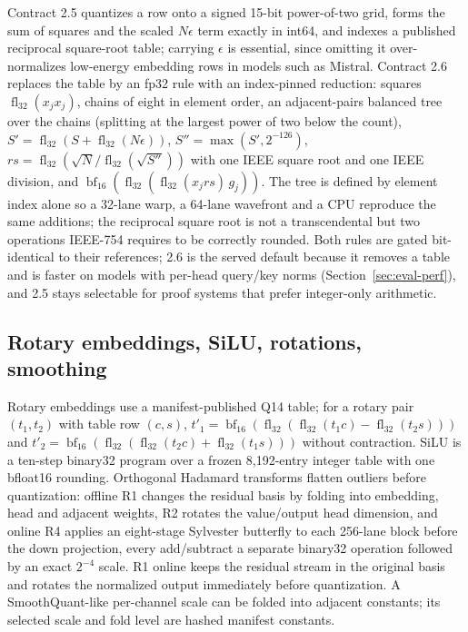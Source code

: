 \documentclass{article}
\newcommand{\fl}{\operatorname{fl}_{32}}
\newcommand{\bfround}{\operatorname{bf}_{16}}
\begin{document}
Contract 2.5 quantizes a row onto a signed 15-bit power-of-two grid, forms the sum of squares
and the scaled $N\epsilon$ term exactly in int64, and indexes a published reciprocal
square-root table; carrying $\epsilon$ is essential, since omitting it over-normalizes
low-energy embedding rows in models such as Mistral.  Contract 2.6 replaces the table by an
fp32 rule with an index-pinned reduction: squares $\fl(x_jx_j)$, chains of eight in element
order, an adjacent-pairs balanced tree over the chains (splitting at the largest power of two
below the count), $S'=\fl(S+\fl(N\epsilon))$, $S''=\max(S',2^{-126})$,
$rs=\fl(\sqrt N/\fl(\sqrt{S''}))$ with one IEEE square root and one IEEE division, and
$\bfround(\fl(\fl(x_jrs)\,g_j))$.  The tree is defined by element index alone so a 32-lane
warp, a 64-lane wavefront and a CPU reproduce the same additions; the reciprocal square root
is not a transcendental but two operations IEEE-754 requires to be correctly rounded.  Both
rules are gated bit-identical to their references; 2.6 is the served default because it
removes a table and is faster on models with per-head query/key norms (Section~\ref{sec:eval-perf}),
and 2.5 stays selectable for proof systems that prefer integer-only arithmetic.

\subsection{Rotary embeddings, SiLU, rotations, smoothing}

Rotary embeddings use a manifest-published Q14 table; for a rotary pair $(t_1,t_2)$ with
table row $(c,s)$, $t'_1=\bfround(\fl(\fl(t_1c)-\fl(t_2s)))$ and
$t'_2=\bfround(\fl(\fl(t_2c)+\fl(t_1s)))$ without contraction.  SiLU is a ten-step binary32
program over a frozen 8,192-entry integer table with one bfloat16 rounding.  Orthogonal
Hadamard transforms flatten outliers before quantization: offline R1 changes the residual
basis by folding into embedding, head and adjacent weights, R2 rotates the value/output head
dimension, and online R4 applies an eight-stage Sylvester butterfly to each 256-lane block
before the down projection, every add/subtract a separate binary32 operation followed by an
exact $2^{-4}$ scale.  R1 online keeps the residual stream in the original basis and rotates
the normalized output immediately before quantization.  A SmoothQuant-like per-channel scale
\cite{xiao2023smoothquant} can be folded into adjacent constants; its selected scale and fold
level are hashed manifest constants.
\end{document}
